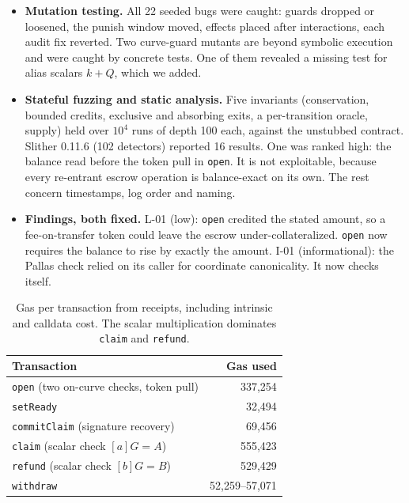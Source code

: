 \documentclass[10pt,letterpaper]{article}
\theoremstyle{plain}
\theoremstyle{definition}
\newcommand{\fn}[1]{\texttt{#1}}
\begin{document}
\begin{itemize}
test vectors are shared with the Rust implementation and the group law is fuzzed. A structured
test covers 514 boundary scalars ($2^i$, $q - 2^i$, $2^{254} \pm 1$ and scalars just below $q$),
each checked against independent affine arithmetic: $[k]G + [q-k]G$ is the identity, doubling
agrees, and the alias $k+q$ is rejected.
\item \textbf{Mutation testing.} All 22 seeded bugs were caught: guards dropped or loosened, the
punish window moved, effects placed after interactions, each audit fix reverted. Two curve-guard
mutants are beyond symbolic execution and were caught by concrete tests. One of them revealed a
missing test for alias scalars $k+Q$, which we added.
\item \textbf{Stateful fuzzing and static analysis.} Five invariants (conservation, bounded credits,
exclusive and absorbing exits, a per-transition oracle, supply) held over $10^4$ runs of depth 100
each, against the unstubbed contract. Slither 0.11.6 (102 detectors) reported 16 results. One was
ranked high: the balance read before the token pull in \fn{open}. It is not exploitable, because
every re-entrant escrow operation is balance-exact on its own. The rest concern timestamps, log
order and naming.
\item \textbf{Findings, both fixed.} L-01 (low): \fn{open} credited the stated amount, so a
fee-on-transfer token could leave the escrow under-collateralized. \fn{open} now requires the
balance to rise by exactly the amount. I-01 (informational): the Pallas check relied on its caller
for coordinate canonicality. It now checks itself.
\end{itemize}

\begin{table}[H]
\centering\small
\begin{tabular}{@{}lr@{}}
\toprule
\textbf{Transaction} & \textbf{Gas used}\\
\midrule
\fn{open} (two on-curve checks, token pull) & 337{,}254\\
\fn{setReady} & 32{,}494\\
\fn{commitClaim} (signature recovery) & 69{,}456\\
\fn{claim} (scalar check $[a]G=A$) & 555{,}423\\
\fn{refund} (scalar check $[b]G=B$) & 529{,}429\\
\fn{withdraw} & 52{,}259--57{,}071\\
\bottomrule
\end{tabular}
\caption{Gas per transaction from receipts, including intrinsic and calldata cost. The scalar
multiplication dominates \fn{claim} and \fn{refund}.}
\end{table}
\end{document}
